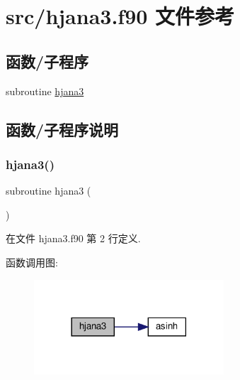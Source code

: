 \hypertarget{hjana3_8f90}{}\section{src/hjana3.f90 文件参考}
\label{hjana3_8f90}
\subsection*{函数/子程序}
\begin{DoxyCompactItemize}
\item 
subroutine \mbox{\hyperlink{hjana3_8f90_a78fc9a6eaf803f077f1ae0a6d41d18f2}{hjana3}}
\end{DoxyCompactItemize}


\subsection{函数/子程序说明}
\mbox{\label{hjana3_8f90_a78fc9a6eaf803f077f1ae0a6d41d18f2}} 
\subsubsection{\texorpdfstring{hjana3()}{hjana3()}}
{\footnotesize\ttfamily subroutine hjana3 (\begin{DoxyParamCaption}{ }\end{DoxyParamCaption})}



在文件 hjana3.\+f90 第 2 行定义.

函数调用图\+:
\nopagebreak
\begin{figure}[H]
\begin{center}
\leavevmode
\includegraphics[width=201pt]{hjana3_8f90_a78fc9a6eaf803f077f1ae0a6d41d18f2_cgraph}
\end{center}
\end{figure}
